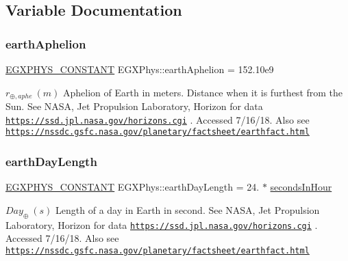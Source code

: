 \subsection{Variable Documentation}
\mbox{\label{group___e_g_x_phys-_constants-_astrophysics-_solar_system-_earth-_orbit_ga603b731138cdd2501278fde244e35180}} 
\subsubsection{\texorpdfstring{earth\+Aphelion}{earthAphelion}}
{\footnotesize\ttfamily \mbox{\hyperlink{group___e_g_x_phys-_constants-_macros_ga76980d288494ce1714c9ac68a95ba702}{E\+G\+X\+P\+H\+Y\+S\+\_\+\+C\+O\+N\+S\+T\+A\+NT}} E\+G\+X\+Phys\+::earth\+Aphelion = 152.\+10e9}

$ r_{\oplus,aphe} \ (m)$ Aphelion of Earth in meters. Distance when it is furthest from the Sun. See N\+A\+SA, Jet Propulsion Laboratory, Horizon for data \href{https://ssd.jpl.nasa.gov/horizons.cgi}{\tt https\+://ssd.\+jpl.\+nasa.\+gov/horizons.\+cgi} . Accessed 7/16/18. Also see \href{https://nssdc.gsfc.nasa.gov/planetary/factsheet/earthfact.html}{\tt https\+://nssdc.\+gsfc.\+nasa.\+gov/planetary/factsheet/earthfact.\+html} \mbox{\label{group___e_g_x_phys-_constants-_astrophysics-_solar_system-_earth-_orbit_ga224cdc14815d33b6a21b0f2988648cf9}} 
\subsubsection{\texorpdfstring{earth\+Day\+Length}{earthDayLength}}
{\footnotesize\ttfamily \mbox{\hyperlink{group___e_g_x_phys-_constants-_macros_ga76980d288494ce1714c9ac68a95ba702}{E\+G\+X\+P\+H\+Y\+S\+\_\+\+C\+O\+N\+S\+T\+A\+NT}} E\+G\+X\+Phys\+::earth\+Day\+Length = 24. $\ast$ \mbox{\hyperlink{namespace_e_g_x_phys_a7c3165cd93e36f1fb8e9fef80f117bef}{seconds\+In\+Hour}}}

$ Day_{\oplus} \ (s)$ Length of a day in Earth in second. See N\+A\+SA, Jet Propulsion Laboratory, Horizon for data \href{https://ssd.jpl.nasa.gov/horizons.cgi}{\tt https\+://ssd.\+jpl.\+nasa.\+gov/horizons.\+cgi} . Accessed 7/16/18. Also see \href{https://nssdc.gsfc.nasa.gov/planetary/factsheet/earthfact.html}{\tt https\+://nssdc.\+gsfc.\+nasa.\+gov/planetary/factsheet/earthfact.\+html} \mbox{\label{group___e_g_x_phys-_constants-_astrophysics-_solar_system-_earth-_orbit_gad9b56019b866d3d6c7f030f37e2cca6b}} 
